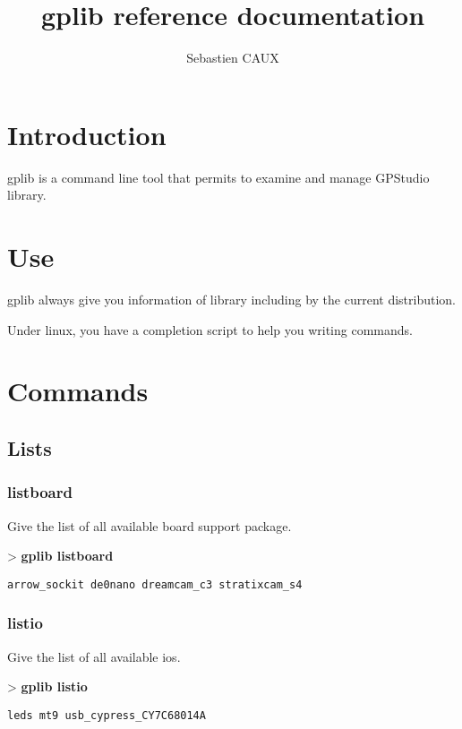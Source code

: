 \documentclass[10pt,a4paper]{article}
\author{Sebastien CAUX}
\title{gplib reference documentation \version}
\begin{document}
\maketitle
\section{Introduction}
gplib is a command line tool that permits to examine and manage GPStudio library.

\section{Use}
gplib always give you information of library including by the current distribution.

Under linux, you have a completion script to help you writing commands.

\section{Commands}
\subsection{Lists}
\subsubsection{listboard}

Give the list of all available board support package.

\begin{sampletitle}
> \textbf{gplib listboard}
\begin{Verbatim}
arrow_sockit de0nano dreamcam_c3 stratixcam_s4
\end{Verbatim}
\end{sampletitle}

\subsubsection{listio}

Give the list of all available ios.

\begin{sampletitle}
> \textbf{gplib listio}
\begin{Verbatim}
leds mt9 usb_cypress_CY7C68014A
\end{Verbatim}
\end{sampletitle}
\end{document}

